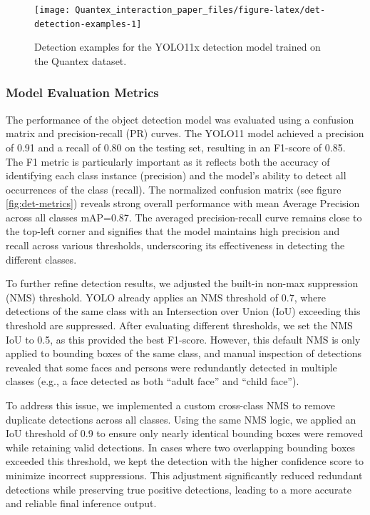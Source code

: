 \documentclass[
  man,floatsintext]{apa6}
\begin{document}
\begin{figure}

{\centering \texttt{[image: Quantex\_interaction\_paper\_files/figure-latex/det-detection-examples-1]} 

}

\caption{Detection examples for the YOLO11x detection model trained on the Quantex dataset.}\label{fig:det-detection-examples}
\end{figure}

\subsubsection{Model Evaluation Metrics}\label{model-evaluation-metrics}

The performance of the object detection model was evaluated using a confusion matrix and precision-recall (PR) curves. The YOLO11 model achieved a precision of 0.91 and a recall of 0.80 on the testing set, resulting in an F1-score of 0.85. The F1 metric is particularly important as it reflects both the accuracy of identifying each class instance (precision) and the model's ability to detect all occurrences of the class (recall). The normalized confusion matrix (see figure \ref{fig:det-metrics}) reveals strong overall performance with mean Average Precision across all classes mAP=0.87. The averaged precision-recall curve remains close to the top-left corner and signifies that the model maintains high precision and recall across various thresholds, underscoring its effectiveness in detecting the different classes.

To further refine detection results, we adjusted the built-in non-max suppression (NMS) threshold. YOLO already applies an NMS threshold of 0.7, where detections of the same class with an Intersection over Union (IoU) exceeding this threshold are suppressed. After evaluating different thresholds, we set the NMS IoU to 0.5, as this provided the best F1-score. However, this default NMS is only applied to bounding boxes of the same class, and manual inspection of detections revealed that some faces and persons were redundantly detected in multiple classes (e.g., a face detected as both ``adult face'' and ``child face'').

To address this issue, we implemented a custom cross-class NMS to remove duplicate detections across all classes. Using the same NMS logic, we applied an IoU threshold of 0.9 to ensure only nearly identical bounding boxes were removed while retaining valid detections. In cases where two overlapping bounding boxes exceeded this threshold, we kept the detection with the higher confidence score to minimize incorrect suppressions. This adjustment significantly reduced redundant detections while preserving true positive detections, leading to a more accurate and reliable final inference output.
\end{document}
